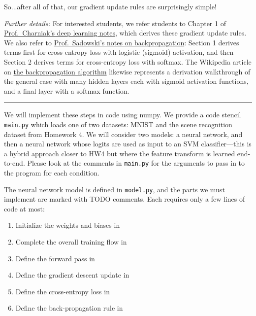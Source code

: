 \documentclass{csci1430}
\begin{document}
So...after all of that, our gradient update rules are surprisingly simple!

\emph{Further details:} For interested students, we refer students to Chapter 1 of \href{https://cs.brown.edu/courses/csci1460/assets/files/deep-learning.pdf}{Prof.~Charniak's deep learning notes}, which derives these gradient update rules. We also refer to \href{http://web.khu.ac.kr/~tskim/MLPR\%2025-3\%20Backpropagation%20with%20CE%20(Handout).pdf}{Prof.~Sadowski's notes on backpropagation}: Section 1 derives terms first for cross-entropy loss with logistic (sigmoid) activation, and then Section 2 derives terms for cross-entropy loss with softmax. The Wikipedia article on \href{https://en.wikipedia.org/wiki/Backpropagation}{the backpropagation algorithm} likewise represents a derivation walkthrough of the general case with many hidden layers each with sigmoid activation functions, and a final layer with a softmax function.

\hspace{\fill}\rule{0.5\linewidth}{.5pt}\hspace{\fill}


We will implement these steps in code using numpy. We provide a code stencil \texttt{main.py} which loads one of two datasets: MNIST and the scene recognition dataset from Homework 4. We will consider two models: a neural network, and then a neural network whose logits are used as input to an SVM classifier---this is a hybrid approach closer to HW4 but where the feature transform is learned end-to-end. Please look at the comments in \texttt{main.py} for the arguments to pass in to the program for each condition. 

The neural network model is defined in \texttt{model.py}, and the parts we must implement are marked with TODO comments. Each requires only a few lines of code at most:
\begin{enumerate}
    \item Initialize the weights and biases in 
    \item Complete the overall training flow in 
    \item Define the forward pass in 
    \item Define the gradient descent update in 
    \item Define the cross-entropy loss in 
    \item Define the back-propagation rule in 
\end{enumerate}
\end{document}
